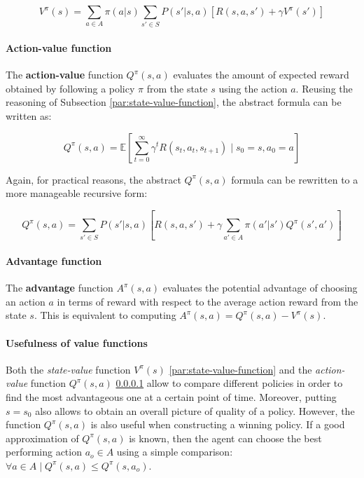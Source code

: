 \begin{equation} \label{eq:v-pi-bellman}
V^{\pi}(s) = \sum _ {a \in A} \pi (a | s) \sum _ {s' \in S} P(s' | s, a) \left[ R(s, a, s') + \gamma V^{\pi}(s') \right]
\end{equation}

\paragraph{Action-value function}
\label{par:action-value-function}

The \textbf{action-value} function $Q^{\pi}(s, a)$ evaluates the amount of expected reward obtained by following a policy $\pi$ from the state $s$ using the action $a$.
Reusing the reasoning of Subsection \ref{par:state-value-function}, the abstract formula can be written as:

\begin{equation} \label{eq:Q-pi-E}
Q^\pi(s, a) = \mathbb{E} \left[ \sum_{t=0}^{\infty} \gamma^t R(s_t, a_t, s_{t+1}) \mid s_0 = s, a_0 = a \right]
\end{equation}

Again, for practical reasons, the abstract $Q^{\pi}(s, a)$ formula can be rewritten to a more manageable recursive form:

\begin{equation} \label{eq:Q-pi-bellman}
Q^{\pi}(s, a) = \sum _ {s' \in S} P(s' | s, a) \left[ R(s, a, s') + \gamma \sum _ {a' \in A} \pi (a' | s') Q^{\pi}(s', a') \right]
\end{equation}

\paragraph{Advantage function}

The \textbf{advantage} function $A^\pi(s, a)$ evaluates the potential advantage of choosing an action $a$ in terms of reward with respect to the average action reward from the state $s$. This is equivalent to computing $A^\pi(s, a) = Q^\pi(s, a) - V^\pi(s)$.

\paragraph{Usefulness of value functions}

Both the \textit{state-value} function $V^{\pi}(s)$ \ref{par:state-value-function} and the \textit{action-value} function $Q^{\pi}(s, a)$ \ref{par:action-value-function} allow to compare different policies in order to find the most advantageous one at a certain point of time. Moreover, putting $s = s_0$ also allows to obtain an overall picture of quality of a policy. However, the function $Q^{\pi}(s, a)$ is also useful when constructing a winning policy. If a good approximation of $Q^{\pi}(s, a)$ is known, then the agent can choose the best performing action $a_o \in A$ using a simple comparison: $\forall a \in A \; | \; Q^{\pi}(s, a) \leq Q^{\pi}(s, a_o)$.

